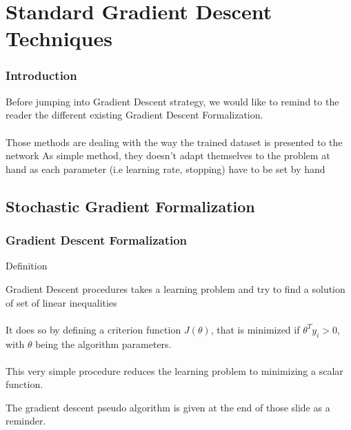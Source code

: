 \documentclass{beamer}
\begin{document}

\section{Standard Gradient Descent Techniques} %

\begin{frame}
\frametitle{Introduction}
Before jumping into Gradient Descent strategy, we would like to remind to the reader the different existing Gradient Descent Formalization.\\~\\
Those methods are dealing with the way the trained dataset is presented to the network
As simple method, they doesn't adapt themselves to the problem at hand as each parameter (i.e learning rate, stopping) have to be set by hand

\end{frame}


\subsection{Stochastic Gradient Formalization}
\begin{frame}
\frametitle{Gradient Descent Formalization}

\begin{block}{Definition}

Gradient Descent procedures takes a learning problem and try to find a solution of set of linear inequalities \\~\\
It does so by defining a criterion function $J(\theta)$, that is minimized if $ \theta^T y_{i} > 0$, with $\theta$ being the algorithm parameters.\\~\\
This very simple procedure reduces the learning problem to minimizing a scalar function.
\end{block}
The gradient descent pseudo algorithm is given at the end of those slide as a reminder.
\end{frame}
\end{document}
